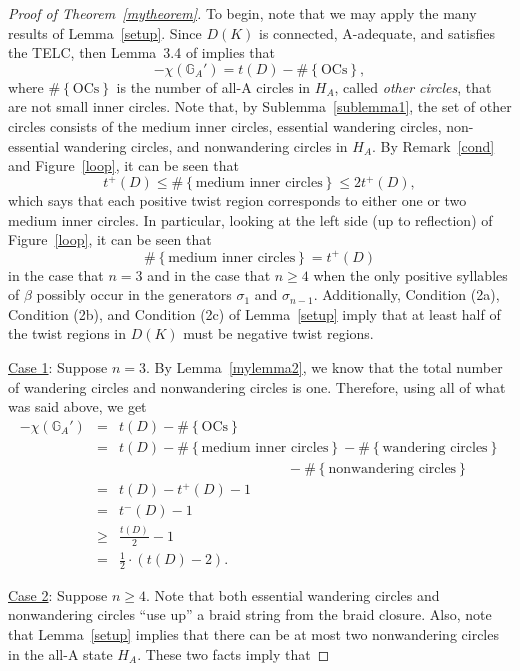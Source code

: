 \documentclass{article}
\begin{document}
\begin{proof}[Proof of Theorem~\ref{mytheorem}] To begin, note that we may apply the many results of Lemma~\ref{setup}. Since $D(K)$ is connected, A-adequate, and satisfies the TELC, then Lemma~3.4 of \cite{Me} implies that $$-\chi(\mathbb{G}_{A}')=t(D)-\#\left\{\text{OCs}\right\},$$ where $\#\left\{\text{OCs}\right\}$ is the number of all-A circles in $H_{A}$, called \emph{other circles}, that are not small inner circles. Note that, by Sublemma~\ref{sublemma1}, the set of other circles consists of the medium inner circles, essential wandering circles, non-essential wandering circles, and nonwandering circles in $H_{A}$. By Remark~\ref{cond} and Figure~\ref{loop}, it can be seen that $$t^{+}(D) \leq \#\left\{\text{medium\ inner\ circles}\right\} \leq 2t^{+}(D),$$ which says that each positive twist region corresponds to either one or two medium inner circles. In particular, looking at the left side (up to reflection) of Figure~\ref{loop}, it can be seen that $$\#\left\{\text{medium\ inner\ circles}\right\} = t^{+}(D)$$ in the case that $n=3$ and in the case that $n \geq 4$ when the only positive syllables of $\beta$ possibly occur in the generators $\sigma_{1}$ and $\sigma_{n-1}$. Additionally, Condition (2a), Condition (2b), and Condition (2c) of Lemma~\ref{setup} imply that at least half of the twist regions in $D(K)$ must be negative twist regions. 

\bigskip

\noindent \underline{Case 1}: Suppose $n=3$. By Lemma~\ref{mylemma2}, we know that the total number of wandering circles and nonwandering circles is one. Therefore, using all of what was said above, we get
\begin{eqnarray*}-\chi(\mathbb{G}_{A}') & = & t(D)-\#\left\{\text{OCs}\right\}\\
\ & = & t(D)-\#\left\{\text{medium\ inner\ circles}\right\}-\#\left\{\text{wandering\ circles}\right\}\\
\ & \ & \hspace{2in} -\#\left\{\text{nonwandering\ circles}\right\}\\
\ & = & t(D)-t^{+}(D)-1\\
\ & = & t^{-}(D)-1\\
\ & \geq & \frac{t(D)}{2}-1\\
\ & = & \frac{1}{2}\cdot (t(D)-2).
\end{eqnarray*} 

\noindent \underline{Case 2}:  Suppose $n\geq4$. Note that both essential wandering circles and nonwandering circles ``use up'' a braid string from the braid closure. Also, note that Lemma~\ref{setup} implies that there can be at most two nonwandering circles in the all-A state $H_{A}$. These two facts imply that


\end{proof}
\end{document}

